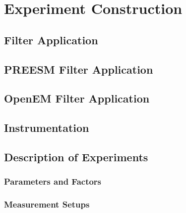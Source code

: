 \chapter{Experiment Construction}
\label{chapter:construction}


\section{Filter Application}
\label{sec:filterapp}


\section{PREESM Filter Application}
\label{sec:preesmapp}


\section{OpenEM Filter Application}
\label{sec:oemapp}


\section{Instrumentation}
\label{sec:instrumentation}


\section{Description of Experiments}
\label{sec:experiment-description}


\subsection{Parameters and Factors}
\label{subsec:parameters-and-factors}


\subsection{Measurement Setups}
\label{subsec:measurement-setups}


